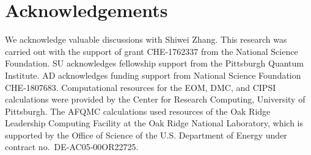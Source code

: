 \section{Acknowledgements}
We acknowledge valuable discussions with Shiwei Zhang.
This research was carried out with the support of grant CHE-1762337 from the National Science Foundation.
SU acknowledges fellowship support from the Pittsburgh Quantum Institute.
AD acknowledges funding support from National Science Foundation CHE-1807683.
Computational resources for the EOM, DMC, and CIPSI calculations were provided by the Center for Research Computing, University of Pittsburgh.
The AFQMC calculations used resources of the Oak Ridge Leadership Computing Facility at the Oak Ridge National Laboratory, which is supported by the Office of Science of the U.S. Department of Energy under contract no.~DE-AC05-00OR22725.
